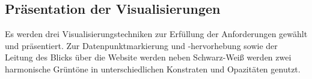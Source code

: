 \documentclass[usegeometry=true]{scrartcl}
\begin{document}

\subsection{Präsentation der Visualisierungen}
Es werden drei Visualisierungstechniken zur Erfüllung der Anforderungen gewählt und präsentiert.
Zur Datenpunktmarkierung und -hervorhebung sowie der Leitung des Blicks über die Website werden neben Schwarz-Weiß werden zwei harmonische Grüntöne in unterschiedlichen Konstraten und Opazitäten genutzt.

\end{document}
